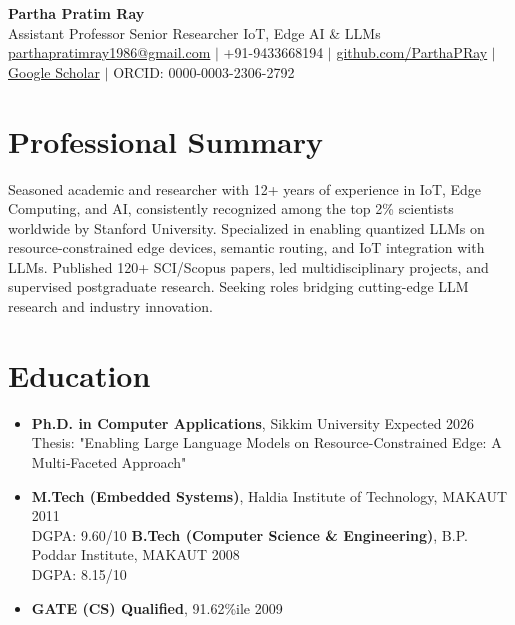 \documentclass[10pt,a4paper]{article}
\begin{document}
	
	\begin{center}
		{\LARGE \textbf{Partha Pratim Ray}} \\
		Assistant Professor \textbullet{} Senior Researcher \textbullet{} IoT, Edge AI \& LLMs \\
		\vspace{0.5em}
		\href{mailto:parthapratimray1986@gmail.com}{parthapratimray1986@gmail.com} $|$
		+91-9433668194 $|$
		\href{https://github.com/ParthaPRay}{github.com/ParthaPRay} $|$
		\href{https://scholar.google.co.in/citations?user=ioplfagAAAAJ}{Google Scholar} $|$
		ORCID: 0000-0003-2306-2792
	\end{center}
	
	\section*{Professional Summary}
	Seasoned academic and researcher with 12+ years of experience in IoT, Edge Computing, and AI, consistently recognized among the top 2\% scientists worldwide by Stanford University. Specialized in enabling quantized LLMs on resource-constrained edge devices, semantic routing, and IoT integration with LLMs. Published 120+ SCI/Scopus papers, led multidisciplinary projects, and supervised postgraduate research. Seeking roles bridging cutting-edge LLM research and industry innovation.
	
	\section*{Education}
	\begin{itemize}
		\item \textbf{Ph.D. in Computer Applications}, Sikkim University \hfill Expected 2026\\
		Thesis: "Enabling Large Language Models on Resource-Constrained Edge: A Multi‑Faceted Approach" 
		\item \textbf{M.Tech (Embedded Systems)}, Haldia Institute of Technology, MAKAUT \hfill 2011\\
		DGPA: 9.60/10
		\textbf{B.Tech (Computer Science \& Engineering)}, B.P. Poddar Institute, MAKAUT \hfill 2008\\
		DGPA: 8.15/10
		\item \textbf{GATE (CS) Qualified}, 91.62\%ile \hfill 2009
	\end{itemize}
	
\end{document}
